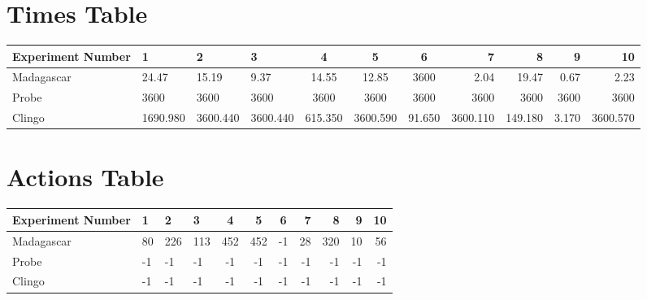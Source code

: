 \documentclass[8pt]{article}
\begin{document}
\begin{landscape}
\section{Times Table}\begin{tabular}{ | l | l | l | l | c | c | c | r | r | r | r | }\hline
Experiment Number & 1 & 2 & 3 & 4 & 5 & 6 & 7 & 8 & 9 & 10\\  \hline
Madagascar & 24.47 & 15.19 & 9.37 & 14.55 & 12.85 & 3600 & 2.04 & 19.47 & 0.67 & 2.23\\  \hline
Probe & 3600 & 3600 & 3600 & 3600 & 3600 & 3600 & 3600 & 3600 & 3600 & 3600\\  \hline
Clingo & 1690.980 & 3600.440 & 3600.440 & 615.350 & 3600.590 & 91.650 & 3600.110 & 149.180 & 3.170 & 3600.570\\ \hline
\end{tabular}
\section{Actions Table}\begin{tabular}{ | l | l | l | l | c | c | c | r | r | r | r | }\hline
Experiment Number & 1 & 2 & 3 & 4 & 5 & 6 & 7 & 8 & 9 & 10\\ \hline
 Madagascar & 80 & 226 & 113 & 452 & 452 & -1 & 28 & 320 & 10 & 56\\ \hline
 Probe & -1 & -1 & -1 & -1 & -1 & -1 & -1 & -1 & -1 & -1\\ \hline
 Clingo & -1 & -1 & -1 & -1 & -1 & -1 & -1 & -1 & -1 & -1\\ \hline
\end{tabular}
\end{landscape}
\end{document}
